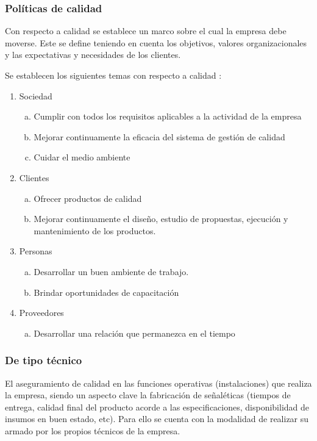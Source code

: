 	\subsubsection{Políticas de calidad}
		
		Con respecto a calidad se establece un marco sobre el cual la empresa debe moverse. Este se define teniendo en cuenta los objetivos, valores organizacionales y las expectativas y necesidades de los clientes.
		
		
		Se establecen los siguientes temas con respecto a calidad :
		
		\begin{enumerate}[1)]
		\item Sociedad
		  \begin{enumerate}[a)]
		  \item Cumplir con todos los requisitos aplicables a la actividad de la empresa
		  \item  Mejorar continuamente la eficacia del sistema de gestión de calidad
		  \item  Cuidar el medio ambiente
		  \end{enumerate}
		\item Clientes
		  \begin{enumerate}[a)]
		  \item Ofrecer productos de calidad
		  \item Mejorar continuamente el diseño, estudio de propuestas, ejecución y mantenimiento de los productos.
		  \end{enumerate}
		\item Personas
		  \begin{enumerate}[a)]
		  \item Desarrollar un buen ambiente de trabajo.
		  \item Brindar oportunidades de capacitación
		  \end{enumerate}
		\item Proveedores
		  \begin{enumerate}[a)]
		  \item Desarrollar una relación que permanezca en el tiempo
		  \end{enumerate}
		\end{enumerate}

      	\subsubsection{De tipo técnico}
      	
			El aseguramiento de calidad en las funciones operativas (instalaciones) que realiza la empresa, siendo un aspecto clave la fabricación de señaléticas (tiempos de entrega, calidad final del producto acorde a las especificaciones, disponibilidad de insumos en buen estado, etc). Para ello se cuenta con la modalidad de realizar su armado por los propios técnicos de la empresa.
	
